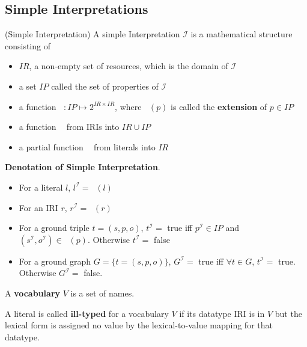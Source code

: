 \documentclass{article}
\DeclareMathOperator{\IEXT}{I_{EXT}}
\DeclareMathOperator{\IL}{I_{L}}
\DeclareMathOperator{\IS}{I_{S}}
\begin{document}
\subsection{Simple Interpretations}

\begin{defin}(Simple Interpretation)\newline
A simple Interpretation $\mathcal{I}$ is a mathematical structure consisting of
\begin{itemize}
\item $IR$, a non-empty set of resources, which is the domain of $\mathcal{I}$
\item a set $IP$ called the set of properties of $\mathcal{I}$
\item a function $\IEXT:IP \mapsto 2^{IR \times IR}$, where $\IEXT(p)$ is called the \textbf{extension} of $p \in IP$
\item a function $\IS$ from IRIs  into $IR \cup IP$
\item a partial function $\IL$ from literals into $IR$
\end{itemize}
\end{defin}

\textbf{Denotation of Simple Interpretation}.
\begin{itemize}
\item For a literal $l$, $l^{\mathcal{I}} = \IL(l)$
\item For an IRI $r$, $r^{\mathcal{I}} = \IS(r)$
\item For a ground triple $t = (s,p,o)$, $t^{\mathcal{I}} = $ true iff $p^{\mathcal{I}} \in IP$ and $(s^{\mathcal{I}}, o^{\mathcal{I}}) \in \IEXT(p)$. Otherwise $t^{\mathcal{I}} =  $ false
\item For a ground graph $G = \{t = (s,p,o)\}$, $G^{\mathcal{I}} = $ true iff $\forall t \in G$, $t^{\mathcal{I}} = $ true. Otherwise $G^{\mathcal{I}} = $ false.
\end{itemize}

\begin{defin}
A \textbf{vocabulary} $V$ is a set of names.
\end{defin}

\begin{defin}
A literal is called \textbf{ill-typed} for a vocabulary $V$ if its datatype IRI is in $V$ but the lexical form is assigned no value by the lexical-to-value mapping for that datatype.
\end{defin}
\end{document}

